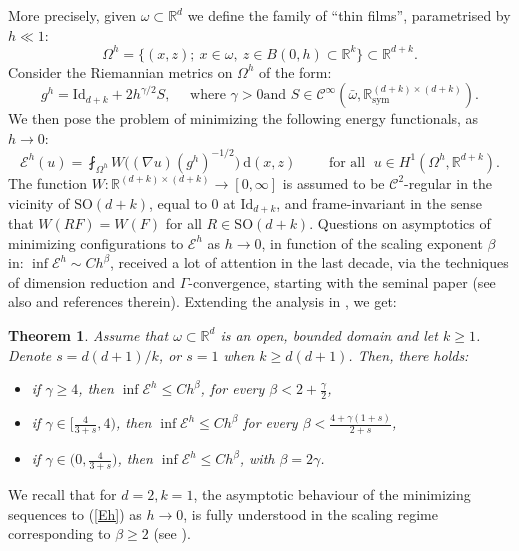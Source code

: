 \documentclass[reqno,twoside,11pt]{amsart}
\newcommand{\sym}{\mathrm{sym}}
\newcommand{\Id}{\mathrm{Id}}
\newcommand{\R}{\mathbb{R}}
\numberwithin{equation}{section}
\theoremstyle{plain}
\newtheorem{theorem}{Theorem}[section]
\theoremstyle{definition}
\begin{document}
\noindent More precisely, given $\omega\subset\R^d$ we define the
family of ``thin films'', parametrised by $h\ll 1$:
$$\Omega^h = \big\{(x,z); ~x\in\omega, ~ z\in B(0,h)\subset\R^k\big\}\subset\R^{d+k}.$$
Consider the Riemannian metrics on $\Omega^h$ of the form:
$$g^h=\Id_{d+k}+2h^{\gamma/2}S, \quad\mbox{ where } \gamma>0 \mbox{
  and } S\in\mathcal{C}^\infty(\bar\omega,\R^{(d+k)\times (d+k)}_\sym).$$
We then pose the problem of minimizing the following energy functionals, as  $h\to 0$:
\begin{equation}\label{Eh}
\mathcal{E}^h(u) = \fint_{\Omega^h} W\big((\nabla u)(g^h)^{-1/2}\big)~\mathrm{d}(x,z)
\qquad\mbox{ for all }\; u\in H^{1}(\Omega^h,\R^{d+k}).
\end{equation}
The function $W:\R^{(d+k)\times (d+k)}\to [0,\infty]$ is assumed
to be $\mathcal{C}^2$-regular in the vicinity of $\mathrm{SO}(d+k)$, equal to
$0$ at $\Id_{d+k}$, and frame-invariant in the sense that $W(RF)= W(F)$
for all $R\in \mathrm{SO}(d+k)$. Questions on asymptotics
of minimizing configurations to $\mathcal{E}^h$ as
$h\to 0$, in function of the scaling exponent $\beta$ in: $\inf \mathcal{E}^h\sim
Ch^\beta$, received a lot of attention in the last
decade, via the techniques of dimension reduction and
$\Gamma$-convergence, starting with the seminal paper \cite{FJM} (see also
\cite{lew_book} and references therein).
Extending the analysis  %
in \cite[Theorem 1.4]{JBL}, we get:

\begin{theorem}\label{th_scaling}
Assume that $\omega\subset\R^d$ is an open, bounded domain and let
$k\geq 1$. Denote $s = d(d+1)/k$, or $s=1$ when $k\geq d(d+1)$. Then, there holds:
\begin{itemize}
\item[(i)] if $\gamma\ge 4$, then $\inf \mathcal{E}^h\leq Ch^{\beta}$, for
  every $\beta<2+\frac{\gamma}{2}$,

\item[(ii)] if $\gamma\in \big[\frac{4}{3+s},4\big)$, then
  $\inf \mathcal{E}^h\leq Ch^{\beta}$ for every $\beta< \frac{4+\gamma (1+s)}{2+s}$,

\item[(iii)] if $\gamma\in \big(0,\frac{4}{3+s}\big)$, then $\inf
  \mathcal{E}^h\leq Ch^{\beta}$, with $\beta = 2\gamma$.
\end{itemize}
\end{theorem}

\noindent We recall that for $d=2, k=1$, the asymptotic behaviour of the
minimizing sequences to (\ref{Eh}) as $h\to 0$, is fully understood in
the scaling regime corresponding to $\beta\geq 2$ (see \cite{lew_book}).
\end{document}
